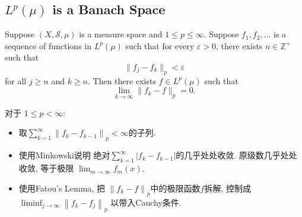 \documentclass[../main.tex]{subfiles}
\begin{document}
\subsection*{\(  L^{p}\left( \mu  \right)   \) is a Banach Space }

\begin{theorem}{}{}
    Suppose \((X,\mathcal{S},\mu)\) is a measure space and \(1 \le p \le \infty\). Suppose \(f_1,f_2,\ldots\) is a sequence of functions in \(L^p(\mu)\) such that for every \(\varepsilon>0\), there exists \(n\in\mathbb{Z}^+\) such that
\[
\lVert f_j-f_k\rVert_p<\varepsilon
\]
for all \(j\ge n\) and \(k\ge n\). Then there exists \(f\in L^p(\mu)\) such that
\[
\lim_{k\to\infty}\lVert f_k-f\rVert_p=0.
\]
\end{theorem}

\begin{proofsketch}
    对于 \(  1\le p< \infty  \):
    
    \begin{itemize}
        \item 取\(  \sum _{k= 1}^{\infty}\left\| f_{k}-f_{k-1} \right\|_{p}< \infty  \)的子列.
        \item 使用Minkowski说明 绝对\(  \sum _{k= 1}^{\infty}\left| f_{k}-f_{k-1} \right|   \)的几乎处处收敛.  原级数几乎处处收敛, 等于极限 \(  \lim_{m\to \infty}f_{m}\left( x \right)   \). 
        \item 使用Fatou's Lemma, 把 \(  \left\| f_{k}-f \right\|_{p}  \)中的极限函数\(  f  \)拆解, 控制成 \( \liminf_{j\to \infty} \left\| f_{k}-f_{j} \right\|_{p}  \)   以带入Cauchy条件. 
    \end{itemize}
    
\end{proofsketch}
\end{document}
